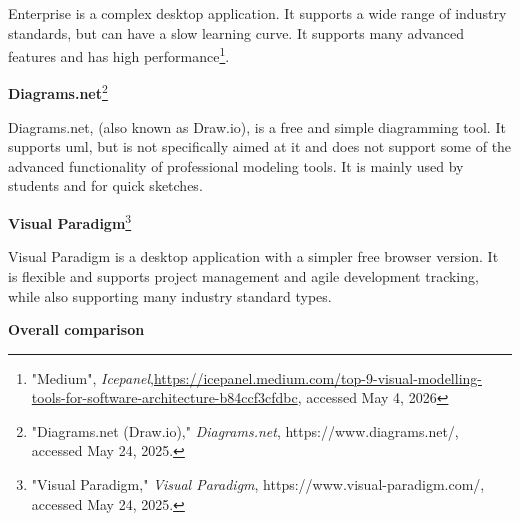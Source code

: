 Enterprise is a complex desktop application. It supports a wide range of industry standards, but can have a slow learning curve. It supports many advanced features and has high performance\footnote{"Medium", \textit{Icepanel},\url{https://icepanel.medium.com/top-9-visual-modelling-tools-for-software-architecture-b84ccf3cfdbc}, accessed May 4, 2026}.

\textbf{Diagrams.net}\footnote{"Diagrams.net (Draw.io)," \textit{Diagrams.net}, https://www.diagrams.net/, accessed May 24, 2025.}


Diagrams.net, (also known as Draw.io), is a free and simple diagramming tool. It supports \ac{uml}, but is not specifically aimed at it and does not support some of the advanced functionality of professional modeling tools. It is mainly used by students and for quick sketches.

\textbf{Visual Paradigm}\footnote{"Visual Paradigm," \textit{Visual Paradigm}, https://www.visual-paradigm.com/, accessed May 24, 2025.}

Visual Paradigm is a desktop application with a simpler free browser version. It is flexible and supports project management and agile development tracking, while also supporting many industry standard types\footnotemark[5].




\textbf{Overall comparison}

